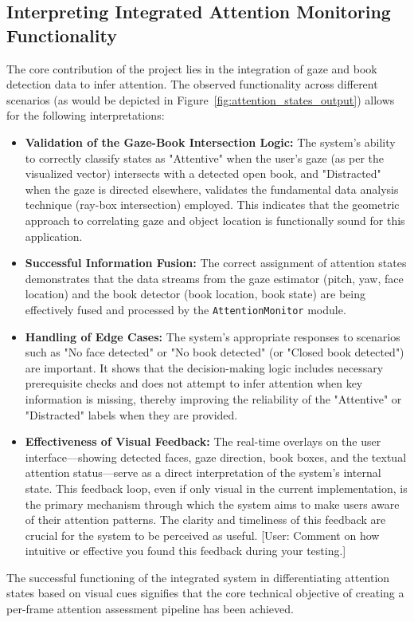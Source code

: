 \subsection{Interpreting Integrated Attention Monitoring Functionality}
The core contribution of the project lies in the integration of gaze and book detection data to infer attention. The observed functionality across different scenarios (as would be depicted in Figure~\ref{fig:attention_states_output}) allows for the following interpretations:
\begin{itemize}
    \item \textbf{Validation of the Gaze-Book Intersection Logic:} The system's ability to correctly classify states as "Attentive" when the user's gaze (as per the visualized vector) intersects with a detected open book, and "Distracted" when the gaze is directed elsewhere, validates the fundamental data analysis technique (ray-box intersection) employed. This indicates that the geometric approach to correlating gaze and object location is functionally sound for this application.
    
    \item \textbf{Successful Information Fusion:} The correct assignment of attention states demonstrates that the data streams from the gaze estimator (pitch, yaw, face location) and the book detector (book location, book state) are being effectively fused and processed by the \texttt{AttentionMonitor} module.
    
    \item \textbf{Handling of Edge Cases:} The system's appropriate responses to scenarios such as "No face detected" or "No book detected" (or "Closed book detected") are important. It shows that the decision-making logic includes necessary prerequisite checks and does not attempt to infer attention when key information is missing, thereby improving the reliability of the "Attentive" or "Distracted" labels when they are provided.
    
    \item \textbf{Effectiveness of Visual Feedback:} The real-time overlays on the user interface—showing detected faces, gaze direction, book boxes, and the textual attention status—serve as a direct interpretation of the system's internal state. This feedback loop, even if only visual in the current implementation, is the primary mechanism through which the system aims to make users aware of their attention patterns. The clarity and timeliness of this feedback are crucial for the system to be perceived as useful. [User: Comment on how intuitive or effective you found this feedback during your testing.]
\end{itemize}
The successful functioning of the integrated system in differentiating attention states based on visual cues signifies that the core technical objective of creating a per-frame attention assessment pipeline has been achieved.

